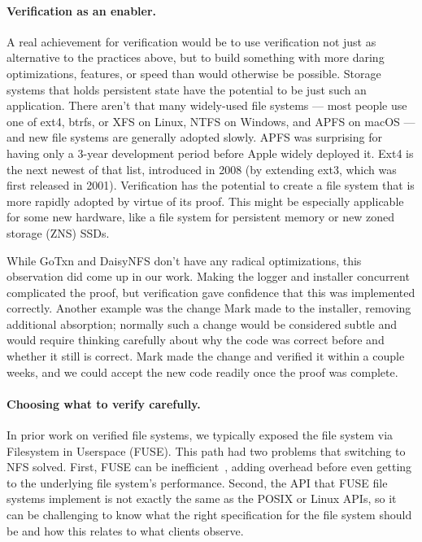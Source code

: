 \paragraph{Verification as an enabler.}
A real achievement for verification would be to use verification not just as
alternative to the practices above, but to build something with more daring optimizations,
features, or speed than would otherwise be possible. Storage systems that holds persistent
state have the potential to be just such an application. There aren't that many
widely-used
file systems --- most people use one of ext4, btrfs, or XFS on Linux, NTFS on
Windows, and APFS on macOS --- and new file systems are generally adopted
slowly. APFS was surprising for having only a 3-year development period before
Apple widely deployed it. Ext4 is the next newest of that list, introduced in
2008 (by extending ext3, which was first released in 2001). Verification has the
potential to create a file system that is more rapidly adopted by virtue of its
proof. This might be especially applicable for some new hardware, like a file
system for persistent memory or new zoned storage (ZNS) SSDs.


While GoTxn and DaisyNFS don't have any radical optimizations, this observation
did come up in our work. Making the logger and installer concurrent complicated
the proof, but verification gave confidence that this was implemented correctly.
Another example was the change Mark made to the installer, removing additional
absorption; normally such a change would be considered subtle and would require
thinking carefully about why the code was correct before and whether it still is
correct. Mark made the change and verified it within a couple weeks, and we
could accept the new code readily once the proof was complete.

\paragraph{Choosing what to verify carefully.}
In prior work on verified file systems, we typically exposed the file system via
Filesystem in Userspace (FUSE). This path had two problems that switching to
NFS solved. First, FUSE can be inefficient~\cite{vangoor:fuse}, adding overhead
before even getting to the underlying file system's performance. Second, the API
that FUSE file systems implement is not exactly the same as the POSIX or Linux
APIs, so it can be challenging to know what the right specification for the file
system should be and how this relates to what clients observe.


